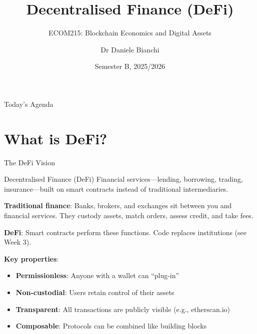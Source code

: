 \documentclass[10pt]{beamer}
\title{Decentralised Finance (DeFi)}
\subtitle{ECOM215: Blockchain Economics and Digital Assets}
\author{Dr Daniele Bianchi}
\institute{Queen Mary, University of London}
\date{Semester B, 2025/2026}
\begin{document}
\AtBeginSection[]{
  \begin{frame}[plain]
    \vfill
    \begin{center}
      {\Large\color{ImperialBlue}\insertsection}
    \end{center}
    \vfill
  \end{frame}
}

\begin{frame}[plain]
  \titlepage
\end{frame}

\begin{frame}{Today's Agenda}
  \tableofcontents
\end{frame}

\section{What is DeFi?}

\begin{frame}{The DeFi Vision}
  \begin{block}{Decentralised Finance (DeFi)}
    Financial services---lending, borrowing, trading, insurance---built on smart contracts instead of traditional intermediaries.
  \end{block}
  
  \vspace{1em}
  \textbf{Traditional finance}: Banks, brokers, and exchanges sit between you and financial services. They custody assets, match orders, assess credit, and take fees.
  
  \vspace{1em}
  \textbf{DeFi}: Smart contracts perform these functions. Code replaces institutions (see Week 3).
  
  \vspace{1em}
  \textbf{Key properties}:
  \begin{itemize}
    \item \textbf{Permissionless}: Anyone with a wallet can ``plug-in''
    \item \textbf{Non-custodial}: Users retain control of their assets
    \item \textbf{Transparent}: All transactions are publicly visible (e.g., etherscan.io)
    \item \textbf{Composable}: Protocols can be combined like building blocks
  \end{itemize}
\end{frame}
\end{document}
